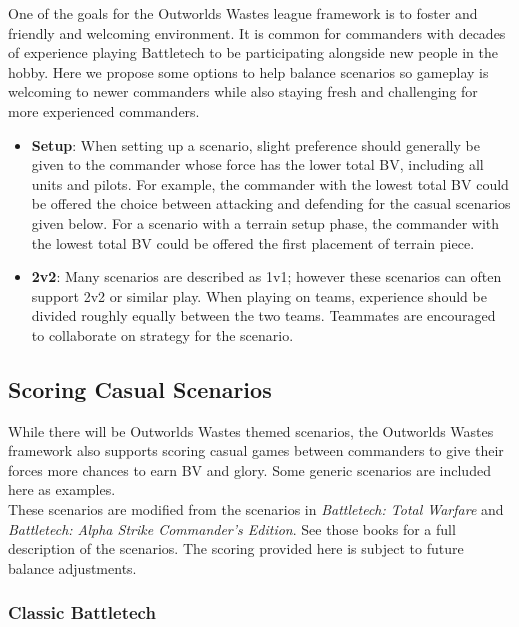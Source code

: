 \documentclass[UTF8]{article}
\begin{document}
One of the goals for the Outworlds Wastes league framework is to foster and friendly and welcoming environment.
It is common for commanders with decades of experience playing Battletech to be participating alongside new people in the hobby.
Here we propose some options to help balance scenarios so gameplay is welcoming to newer commanders while also staying fresh and challenging for more experienced commanders.\\

\begin{itemize}

\item {\bf Setup}: When setting up a scenario, slight preference should generally be given to the commander whose force has the lower total BV, including all units and pilots.
For example, the commander with the lowest total BV could be offered the choice between attacking and defending for the casual scenarios given below.
For a scenario with a terrain setup phase, the commander with the lowest total BV could be offered the first placement of terrain piece.

\item {\bf 2v2}: Many scenarios are described as 1v1; however these scenarios can often support 2v2 or similar play.
When playing on teams, experience should be divided roughly equally between the two teams.
Teammates are encouraged to collaborate on strategy for the scenario.

\end{itemize}

\subsection{Scoring Casual Scenarios}

While there will be Outworlds Wastes themed scenarios, the Outworlds Wastes framework also supports scoring casual games between commanders to give their forces more chances to earn BV and glory.
Some generic scenarios are included here as examples.\\

These scenarios are modified from the scenarios in \emph{Battletech: Total Warfare} and \emph{Battletech: Alpha Strike Commander's Edition}.
See those books for a full description of the scenarios.
The scoring provided here is subject to future balance adjustments.\\

\subsubsection{Classic Battletech}
\end{document}

